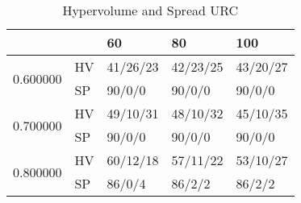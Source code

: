 \begin{table}
\caption{Hypervolume and Spread URC}
\begin{tabular}{lllll}
\toprule
 &  & 60 & 80 & 100 \\
\midrule
\multirow[t]{2}{*}{0.600000} & HV & 41/26/23 & 42/23/25 & 43/20/27 \\
 & SP & 90/0/0 & 90/0/0 & 90/0/0 \\
\cline{1-5}
\multirow[t]{2}{*}{0.700000} & HV & 49/10/31 & 48/10/32 & 45/10/35 \\
 & SP & 90/0/0 & 90/0/0 & 90/0/0 \\
\cline{1-5}
\multirow[t]{2}{*}{0.800000} & HV & 60/12/18 & 57/11/22 & 53/10/27 \\
 & SP & 86/0/4 & 86/2/2 & 86/2/2 \\
\cline{1-5}
\bottomrule
\end{tabular}
\end{table}
